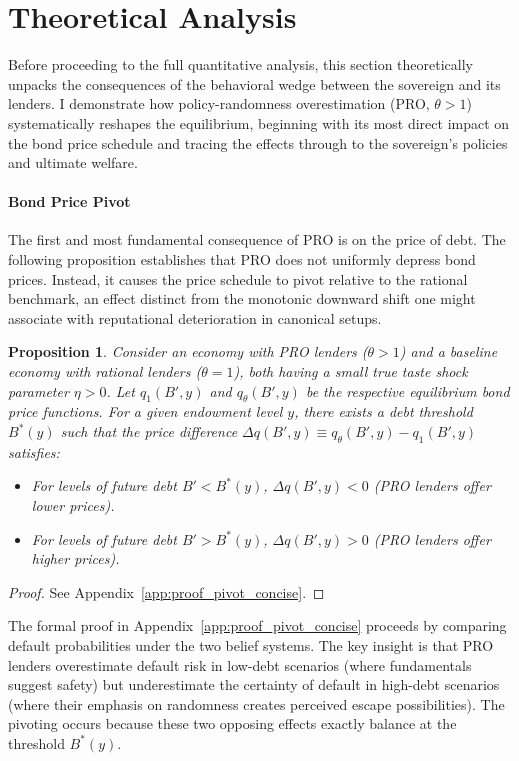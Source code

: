 \documentclass[12pt]{article}
\theoremstyle{plain}
\newtheorem{proposition}{Proposition}
\begin{document}
\section{Theoretical Analysis}
\label{sec:theory}

Before proceeding to the full quantitative analysis, this section theoretically
unpacks the consequences of the behavioral wedge between the sovereign and its
lenders. I demonstrate how policy-randomness overestimation (PRO, $\theta > 1$)
systematically reshapes the equilibrium, beginning with its most direct impact
on the bond price schedule and tracing the effects through to the sovereign's
policies and ultimate welfare.

\paragraph{Bond Price Pivot}The first and most fundamental consequence of PRO is on the price of debt. The
following proposition establishes that PRO does not uniformly depress bond
prices. Instead, it causes the price schedule to pivot relative to the rational
benchmark, an effect distinct from the monotonic downward shift one might
associate with reputational deterioration in canonical setups.

\begin{proposition}\label{prop:pivot_concise}
	Consider an economy with PRO lenders ($\theta > 1$) and a baseline economy with rational lenders ($\theta = 1$), both having a small true taste shock parameter $\eta > 0$. Let $q_1(B', y)$ and $q_\theta(B', y)$ be the respective equilibrium bond price functions. For a given endowment level $y$, there exists a debt threshold $B^*(y)$ such that the price difference $\Delta q(B', y) \equiv q_\theta(B', y) - q_1(B', y)$ satisfies:
	\begin{itemize}
		\item For levels of future debt $B' < B^*(y)$, $\Delta q(B', y) < 0$ (PRO lenders
		      offer lower prices).
		\item For levels of future debt $B' > B^*(y)$, $\Delta q(B', y) > 0$ (PRO lenders
		      offer higher prices).
	\end{itemize}
\end{proposition}

\begin{proof}
	See Appendix~\ref{app:proof_pivot_concise}.
\end{proof}

The formal proof in Appendix~\ref{app:proof_pivot_concise} proceeds by
comparing default probabilities under the two belief systems. The key insight
is that PRO lenders overestimate default risk in low-debt scenarios (where
fundamentals suggest safety) but underestimate the certainty of default in
high-debt scenarios (where their emphasis on randomness creates perceived
escape possibilities). The pivoting occurs because these two opposing effects
exactly balance at the threshold $B^*(y)$.
\end{document}
